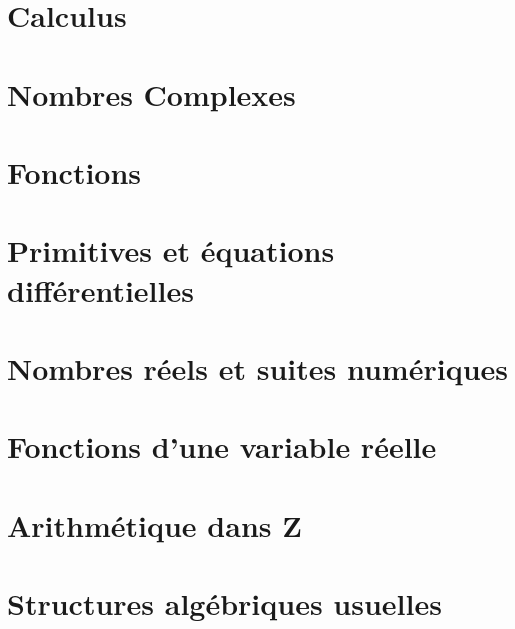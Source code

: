 \documentclass[a4paper, 10pt, twoside]{report}
\begin{document}
    

\chapter{Calculus}

    

\chapter{Nombres Complexes}

    
    
\chapter{Fonctions}

    
        
\chapter{Primitives et équations différentielles}

    

\chapter{Nombres réels et suites numériques}

    

\chapter{Fonctions d'une variable réelle}

    

\chapter{Arithmétique dans $\mathbf{Z}$}

    

\chapter{Structures algébriques usuelles}

    
    
\end{document}
